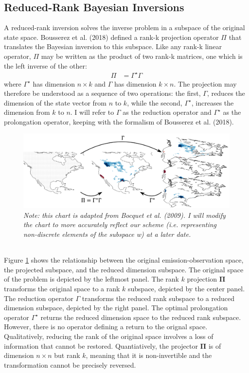 \documentclass{article}
\newcommand{\g}{\Gamma}
\newcommand{\gstar}{\Gamma^{\star}}
\begin{document}
\subsection{Reduced-Rank Bayesian Inversions}{\label{red_rank_invs}
A reduced-rank inversion solves the inverse problem in a subspace of the original state space. Bousserez et al. (2018) defined a rank-k projection operator $\Pi$ that translates the Bayesian inversion to this subspace. Like any rank-k linear operator, $\Pi$ may be written as the product of two rank-k matrices, one which is the left inverse of the other:
\begin{align}
	\Pi &= \gstar\g
\end{align}
where $\gstar$ has dimension $n \times k$ and $\g$ has dimension $k \times n$. The projection may therefore be understood as a sequence of two operations: the first, $\g$, reduces the dimension of the state vector from $n$ to $k$, while the second, $\gstar$, increases the dimension from $k$ to $n$. I will refer to $\g$ as the reduction operator and $\gstar$ as the prolongation operator, keeping with the formalism of Bousserez et al. (2018).\\
\begin{figure}[h]
	\begin{center}
		\includegraphics[width=6in]{dim_rank_scheme.png}
		\caption{\textit{Note: this chart is adapted from Bocquet et al. (2009). I will modify the chart to more accurately reflect our scheme (i.e. representing non-discrete elements of the subspace w) at a later date.}}
		\label{space_flow_chart}
	\end{center}
\end{figure}\\
Figure \ref{space_flow_chart} shows the relationship between the  original emission-observation space, the projected subspace, and the reduced dimension subspace. The original space of the problem is depicted by the leftmost panel. The rank $k$ projection $\mathbf{\Pi}$ transforms the original space to a rank $k$ subspace, depicted by the center panel. The reduction operator $\g$ transforms the reduced rank subspace to a reduced dimension subspace, depicted by the right panel. The optimal prolongation operator $\gstar$ returns the reduced dimension space to the reduced rank subspace. However, there is no operator defining a return to the orignal space. Qualitatively, reducing the rank of the original space involves a loss of information that cannot be restored. Quantiatively, the projector $\mathbf{\Pi}$ is of dimension $n \times n$ but rank $k$, meaning that it is non-invertible and the transformation cannot be precisely reversed.\\
}
\end{document}
